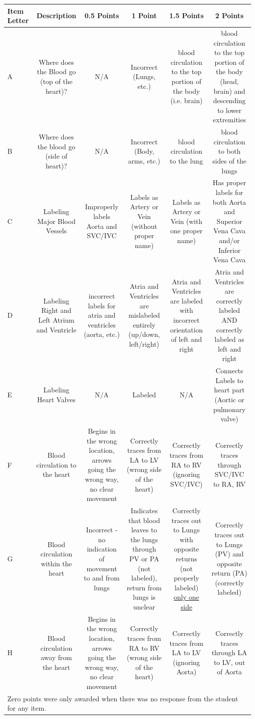 \documentclass[11.5pt]{sig-alternate} %
\begin{document}
\begin{table}[!hbp]
\begin{tabular}{|l|c|c|c|c|c|}
\hline
\centering \textbf{Item Letter} & \textbf{Description} & \textbf{0.5 Points} & \textbf{1 Point} & \textbf{1.5 Points} & \textbf{2 Points} \\ \hline
A & Where does the Blood go (top of the heart)? & N/A & Incorrect (Lungs, etc.) & blood circulation to the top portion of the body (i.e. brain) & blood circulation to the top portion of the body (head, brain) and descending to lower extremities \\ \hline
B & Where does the blood go (side of heart)? & N/A & Incorrect (Body, arms, etc.) & blood circulation to the lung & blood circulation to both sides of the lungs \\ \hline
C & Labeling Major Blood Vessels & Improperly labels Aorta and SVC/IVC & Labels as Artery or Vein (without proper name) & Labels as Artery or Vein (with one proper name) & Has proper labels for both Aorta and Superior Vena Cava and/or Inferior Vena Cava \\ \hline
D & Labeling Right and Left Atrium and Ventricle & incorrect labels for atria and ventricles (aorta, etc.) & Atria and Ventricles are mislabeled entirely (up/down, left/right) & Atria and Ventricles are labeled with incorrect orientation of left and right & Atria and Ventricles are correctly labeled AND correctly labeled as left and right \\ \hline
E & Labeling Heart Valves & N/A & Labeled & N/A & Connects Labels to heart part (Aortic or pulmonary valve) \\ \hline
F & Blood circulation to the heart & Begins in the wrong location, arrows going the wrong way, no clear movement & Correctly traces from LA to LV (wrong side of the heart) & Correctly traces from RA to RV (ignoring SVC/IVC) & Correctly traces through SVC/IVC to RA, RV \\ \hline
G & Blood circulation within the heart & Incorrect - no indication of movement to and from lungs & Indicates that blood leaves to the lungs through PV or PA (not labeled), return from lungs is unclear & Correctly traces out to Lungs with opposite returns (not properly labeled) \underline{only one side} & Correctly traces out to Lungs (PV) and opposite return (PA) (correctly labeled) \\ \hline
H & Blood circulation away from the heart & Begins in the wrong location, arrows going the wrong way, no clear movement & Correctly traces from RA to RV (wrong side of the heart) & Correctly traces from LA to LV (ignoring Aorta) & Correctly traces through LA to LV, out of Aorta \\ \hline
\multicolumn{6}{|l|}{Zero points were only awarded when there was no response from the student for any item.} \\ \hline
\end{tabular}
\end{table}
\end{document}
